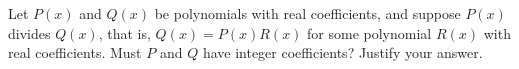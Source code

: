 Let $P(x)$ and $Q(x)$ be polynomials with real coefficients, and suppose $P(x)$ divides $Q(x)$, that is, $Q(x)=P(x)R(x)$ for some polynomial $R(x)$ with real coefficients. Must $P$ and $Q$ have integer coefficients? Justify your answer.
